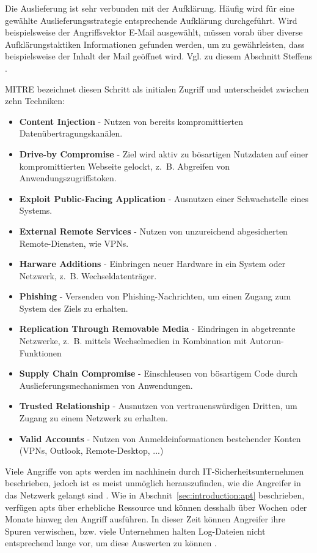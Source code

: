 \documentclass[conference]{IEEEtran}
\begin{document}
Die Auslieferung ist sehr verbunden mit der Aufklärung.
Häufig wird für eine gewählte Auslieferungsstrategie entsprechende Aufklärung durchgeführt.
Wird beispielsweise der Angriffsvektor E-Mail ausgewählt, müssen vorab über diverse Aufklärungstaktiken Informationen gefunden werden, um zu gewährleisten, dass beispielsweise der Inhalt der Mail geöffnet wird.
Vgl. zu diesem Abschnitt Steffens \cite[S.~10ff]{Steffens2020}.

MITRE \cite{MITREInitialAccess} bezeichnet diesen Schritt als initialen Zugriff und unterscheidet zwischen zehn Techniken:
\begin{itemize}
    \item \textbf{Content Injection} - Nutzen von bereits kompromittierten Datenübertragungskanälen.
    \item \textbf{Drive-by Compromise} - Ziel wird aktiv zu bösartigen Nutzdaten auf einer kompromittierten Webseite gelockt, z.~B. Abgreifen von Anwendungszugriffstoken.
    \item \textbf{Exploit Public-Facing Application} - Ausnutzen einer Schwachstelle eines Systems.
    \item \textbf{External Remote Services} - Nutzen von unzureichend abgesicherten Remote-Diensten, wie VPNs.
    \item \textbf{Harware Additions} - Einbringen neuer Hardware in ein System oder Netzwerk, z.~B. Wechseldatenträger.
    \item \textbf{Phishing} - Versenden von Phishing-Nachrichten, um einen Zugang zum System des Ziels zu erhalten.
    \item \textbf{Replication Through Removable Media} - Eindringen in abgetrennte Netzwerke, z.~B. mittels Wechselmedien in Kombination mit Autorun-Funktionen
    \item \textbf{Supply Chain Compromise} - Einschleusen von bösartigem Code durch Auslieferungsmechanismen von Anwendungen.
    \item \textbf{Trusted Relationship} - Ausnutzen von vertrauenswürdigen Dritten, um Zugang zu einem Netzwerk zu erhalten.
    \item \textbf{Valid Accounts} - Nutzen von Anmeldeinformationen bestehender Konten (VPNs, Outlook, Remote-Desktop, ...)
\end{itemize}
Viele Angriffe von \acp{apt} werden im nachhinein durch IT-Sicherheitsunternehmen beschrieben, jedoch ist es meist unmöglich herauszufinden, wie die Angreifer in das Netzwerk gelangt sind \cite[S.~14]{Steffens2020}.
Wie in Abschnit~\ref{sec:introduction:apt} beschrieben, verfügen \acp{apt} über erhebliche Ressource und können desshalb über Wochen oder Monate hinweg den Angriff ausführen.
In dieser Zeit können Angreifer ihre Spuren verwischen, bzw. viele Unternehmen halten Log-Dateien nicht entsprechend lange vor, um diese Auswerten zu können \cite[S.~15]{Steffens2020}.
\end{document}
